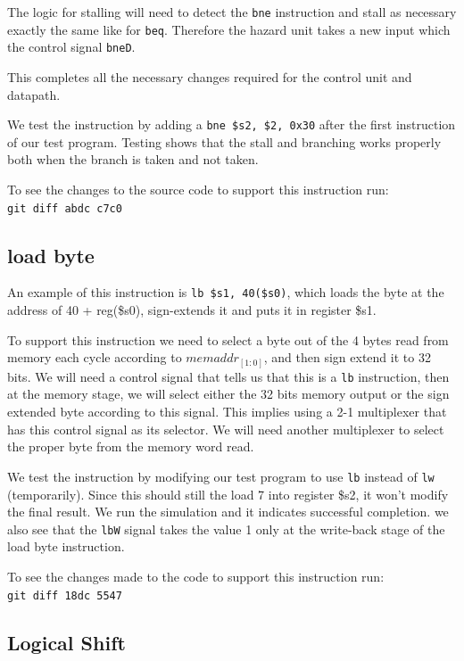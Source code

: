 \documentclass[titlepage,12pt,oneside,a4paper]{article}
\newcommand{\code}[1]{{\texttt{#1}}}
\begin{document}
The logic for stalling will need to detect the \code{bne} instruction and stall as necessary exactly the same like for \code{beq}. Therefore the hazard unit takes a new input which the control signal \code{bneD}.

This completes all the necessary changes required for the control unit and datapath.

We test the instruction by adding a \code{bne \$s2, \$2, 0x30} after the first instruction of our test program. Testing shows that the stall and branching works properly both when the branch is taken and not taken.

To see the changes to the source code to support this instruction run:\\
\code{git diff abdc c7c0}

\subsection{load byte}

An example of this instruction is \code{lb \$s1, 40(\$s0)}, which loads the byte at the address of 40 + reg(\$s0), sign-extends it and puts it in register \$s1.

To support this instruction we need to select a byte out of the 4 bytes read from memory each cycle according to $memaddr_{[1:0]}$, and then sign extend it to 32 bits. We will need a control signal that tells us that this is a \code{lb} instruction, then at the memory stage, we will select either the 32 bits memory output or the sign extended byte according to this signal. This implies using a 2-1 multiplexer that has this control signal as its selector. We will need another multiplexer to select the proper byte from the memory word read.

We test the instruction by modifying our test program to use \code{lb} instead of \code{lw} (temporarily). Since this should still the load 7 into register \$s2, it won't modify the final result. We run the simulation and it indicates successful completion. we also see that the \code{lbW} signal takes the value 1 only at the write-back stage of the load byte instruction.

To see the changes made to the code to support this instruction run:\\
\code{git diff 18dc 5547}

\subsection{Logical Shift}
\end{document}
